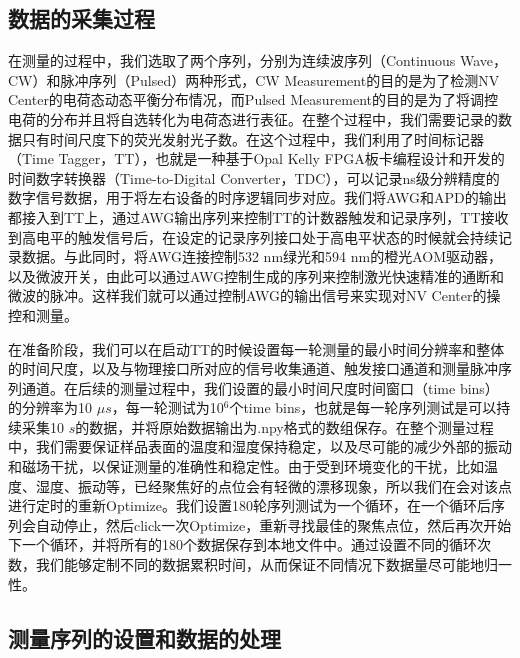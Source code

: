 \documentclass[type = bachelor]{whu-thesis}
\begin{document}
\subsection{数据的采集过程}
在测量的过程中，我们选取了两个序列，分别为连续波序列（Continuous Wave，CW）和脉冲序列（Pulsed）两种形式，CW Measurement的目的是为了检测NV Center的电荷态动态平衡分布情况，而Pulsed Measurement的目的是为了将调控电荷的分布并且将自选转化为电荷态进行表征。在整个过程中，我们需要记录的数据只有时间尺度下的荧光发射光子数。在这个过程中，我们利用了时间标记器（Time Tagger，TT），也就是一种基于Opal Kelly FPGA板卡编程设计和开发的时间数字转换器（Time-to-Digital Converter，TDC），可以记录ns级分辨精度的数字信号数据，用于将左右设备的时序逻辑同步对应。我们将AWG和APD的输出都接入到TT上，通过AWG输出序列来控制TT的计数器触发和记录序列，TT接收到高电平的触发信号后，在设定的记录序列接口处于高电平状态的时候就会持续记录数据。与此同时，将AWG连接控制532 nm绿光和594 nm的橙光AOM驱动器，以及微波开关，由此可以通过AWG控制生成的序列来控制激光快速精准的通断和微波的脉冲。这样我们就可以通过控制AWG的输出信号来实现对NV Center的操控和测量。

在准备阶段，我们可以在启动TT的时候设置每一轮测量的最小时间分辨率和整体的时间尺度，以及与物理接口所对应的信号收集通道、触发接口通道和测量脉冲序列通道。在后续的测量过程中，我们设置的最小时间尺度时间窗口（time bins）的分辨率为10 $\mu s$，每一轮测试为10$^6$个time bins，也就是每一轮序列测试是可以持续采集10 $s$的数据，并将原始数据输出为.npy格式的数组保存。在整个测量过程中，我们需要保证样品表面的温度和湿度保持稳定，以及尽可能的减少外部的振动和磁场干扰，以保证测量的准确性和稳定性。由于受到环境变化的干扰，比如温度、湿度、振动等，已经聚焦好的点位会有轻微的漂移现象，所以我们在会对该点进行定时的重新Optimize。我们设置180轮序列测试为一个循环，在一个循环后序列会自动停止，然后click一次Optimize，重新寻找最佳的聚焦点位，然后再次开始下一个循环，并将所有的180个数据保存到本地文件中。通过设置不同的循环次数，我们能够定制不同的数据累积时间，从而保证不同情况下数据量尽可能地归一性。


\subsection{测量序列的设置和数据的处理}
\end{document}

